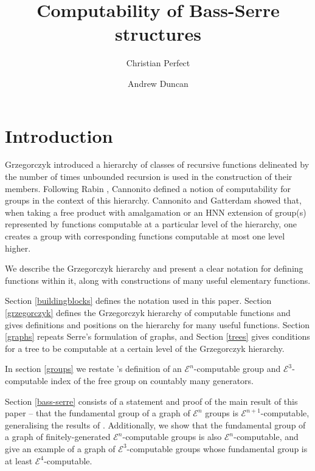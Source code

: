 \documentclass[a4paper]{article}
\newcommand{\grz}[1]{$\mathcal{E}^{#1}$}	%
\theoremstyle{plain}
\theoremstyle{definition}
\begin{document}
\title{Computability of Bass-Serre structures}
\author{Christian Perfect \and Andrew Duncan}
\maketitle

\section*{Introduction}

Grzegorczyk \cite{Grzegorczyk_1953} introduced a hierarchy of classes of recursive functions delineated by the number of times unbounded recursion is used in the construction of their members. Following Rabin \cite{Rabin_1960}, Cannonito \cite{Cannonito_1966} defined a notion of computability for groups in the context of this hierarchy. Cannonito and Gatterdam \cite{Cannonito_1973} \cite{Gatterdam_1973} showed that, when taking a free product with amalgamation or an HNN extension of group(s) represented by functions computable at a particular level of the hierarchy, one creates a group with corresponding functions computable at most one level higher.

We describe the Grzegorczyk hierarchy and present a clear notation for defining functions within it, along with constructions of many useful elementary functions. 

Section \ref{buildingblocks} defines the notation used in this paper. Section \ref{grzegorczyk} defines the Grzegorczyk hierarchy of computable functions and gives definitions and positions on the hierarchy for many useful functions. Section \ref{graphs} repeats Serre's formulation of graphs, and Section \ref{trees} gives conditions for a tree to be computable at a certain level of the Grzegorczyk hierarchy.

In section \ref{groups} we restate \cite{Cannonito_1966}'s definition of an \grz{n}-computable group and \grz{3}-computable index of the free group on countably many generators. 

Section \ref{bass-serre} consists of a statement and proof of the main result of this paper -- that the fundamental group of a graph of \grz{n} groups is \grz{n+1}-computable, generalising the results of \cite{Cannonito_1973}. Additionally, we show that the fundamental group of a graph of finitely-generated \grz{n}-computable groups is also \grz{n}-computable, and give an example of a graph of \grz{3}-computable groups whose fundamental group is at least \grz{4}-computable.
\end{document}
